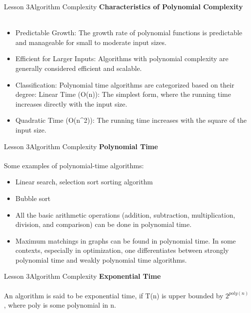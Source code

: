 \documentclass[aspectratio=1610]{beamer}
\begin{document}
\begin{frame}{Lesson 3}{Algorithm Complexity}
\LARGE
\textbf{Characteristics of Polynomial Complexity}\\~\\
\Large
\begin{itemize}
	\item Predictable Growth: The growth rate of polynomial functions is predictable and manageable for small to moderate input sizes.
	\item Efficient for Larger Inputs: Algorithms with polynomial complexity are generally considered efficient and scalable.
	\item Classification: Polynomial time algorithms are categorized based on their degree: Linear Time (O(n)): The simplest form, where the running time increases directly with the input size.
	\item Quadratic Time (O(n^2)): The running time increases with the square of the input size.
\end{itemize}
\end{frame}




\begin{frame}{Lesson 3}{Algorithm Complexity}
\LARGE
\textbf{Polynomial Time}\\~\\
\Large
Some examples of polynomial-time algorithms:
\begin{itemize}
	\item Linear search, selection sort sorting algorithm 
	\item Bubble sort
	\item All the basic arithmetic operations (addition, subtraction, multiplication, division, and comparison) can be done in polynomial time.
	\item Maximum matchings in graphs can be found in polynomial time. In some contexts, especially in optimization, one differentiates between strongly polynomial time and weakly polynomial time algorithms.
\end{itemize}
\end{frame}



\begin{frame}{Lesson 3}{Algorithm Complexity}
\LARGE
\textbf{Exponential Time}\\~\\
\Large
An algorithm is said to be exponential time, if T(n) is upper bounded by
\(2^{poly(n)}\), where poly is some polynomial in n.
\end{frame}
\end{document}
